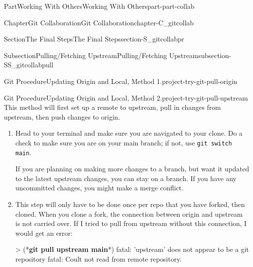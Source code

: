 \documentclass[oneside,10pt,]{book}
\newcommand{\mono}[1]{\texttt{#1}}
\newcommand{\consoleinput}[1]{\textbf{#1}}
\begin{document}
\begin{partptx}{Part}{Working With Others}{}{Working With Others}{}{}{part-part-collab}
\begin{chapterptx}{Chapter}{Git Collaboration}{}{Git Collaboration}{}{}{chapter-C_gitcollab}
\begin{sectionptx}{Section}{The Final Steps}{}{The Final Steps}{}{}{section-S_gitcollabpr}
\begin{subsectionptx}{Subsection}{Pulling\slash{}Fetching Upstream}{}{Pulling\slash{}Fetching Upstream}{}{}{subsection-SS_gitcollabpull}
\begin{project}{Git Procedure}{Updating Origin and Local, Method 1.}{project-try-git-pull-origin}
\end{project}%
\begin{project}{Git Procedure}{Updating Origin and Local, Method 2.}{project-try-git-pull-upstream}%
%
%
%
%
%
%
%
%
This method will first set up a remote to upstream, pull in changes from upstream, then push changes to origin.%
\begin{enumerate}[font=\bfseries,label=(\alph*),ref=\alph*]%
\item{}Head to your terminal and make sure you are navigated to your clone. Do a check to make sure you are on your main branch; if not, use \mono{git switch main}.%
\par
If you are planning on making more changes to a branch, but want it updated to the latest upstream changes, you can stay on a branch. If you have any uncommitted changes, you might make a merge conflict.%
\item{}This step will only have to be done once per repo that you have forked, then cloned. When you clone a fork, the connection between origin and upstream is not carried over. If I tried to pull from upstream without this connection, I would get an error:%
\begin{console}{0}{1}{0}
> (*\consoleinput{git pull upstream main}*)
fatal: 'upstream' does not appear to be a git repository
fatal: Coult not read from remote repository.


\end{console}
\end{enumerate}
\end{project}
\end{subsectionptx}
\end{sectionptx}
\end{chapterptx}
\end{partptx}
\end{document}
